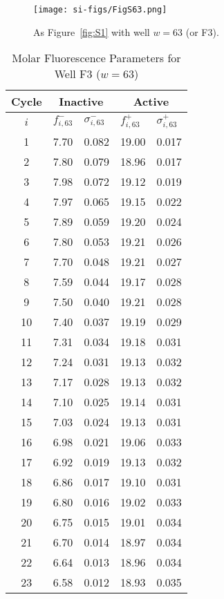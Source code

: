                 \begin{figure}
                    \centering
                    \texttt{[image: si-figs/FigS63.png]}
                    \caption{
                        As Figure~\ref{fig:S1} with well $w=63$ (or F3).
                    }
                \end{figure}
                \clearpage
    \begin{table}
        \caption{Molar Fluorescence Parameters for Well F3 ($w=63$)}
        \centering
        \begin{tabular}{c|ll|ll}
            Cycle & \multicolumn{2}{c|}{Inactive} & \multicolumn{2}{c}{Active} \\
            \hline
            $i$ & $f_{i,63}^{-}$ & $\sigma_{i,63}^{-}$ &  $f_{i,63}^{+}$ & $\sigma_{i,63}^{+}$ \\
            \hline
    1 & 7.70 & 0.082 & 19.00 & 0.017 \\
2 & 7.80 & 0.079 & 18.96 & 0.017 \\
3 & 7.98 & 0.072 & 19.12 & 0.019 \\
4 & 7.97 & 0.065 & 19.15 & 0.022 \\
5 & 7.89 & 0.059 & 19.20 & 0.024 \\
6 & 7.80 & 0.053 & 19.21 & 0.026 \\
7 & 7.70 & 0.048 & 19.21 & 0.027 \\
8 & 7.59 & 0.044 & 19.17 & 0.028 \\
9 & 7.50 & 0.040 & 19.21 & 0.028 \\
10 & 7.40 & 0.037 & 19.19 & 0.029 \\
11 & 7.31 & 0.034 & 19.18 & 0.031 \\
12 & 7.24 & 0.031 & 19.13 & 0.032 \\
13 & 7.17 & 0.028 & 19.13 & 0.032 \\
14 & 7.10 & 0.025 & 19.14 & 0.031 \\
15 & 7.03 & 0.024 & 19.13 & 0.031 \\
16 & 6.98 & 0.021 & 19.06 & 0.033 \\
17 & 6.92 & 0.019 & 19.13 & 0.032 \\
18 & 6.86 & 0.017 & 19.10 & 0.031 \\
19 & 6.80 & 0.016 & 19.02 & 0.033 \\
20 & 6.75 & 0.015 & 19.01 & 0.034 \\
21 & 6.70 & 0.014 & 18.97 & 0.034 \\
22 & 6.64 & 0.013 & 18.96 & 0.034 \\
23 & 6.58 & 0.012 & 18.93 & 0.035 \\

\end{tabular}
\end{table}
